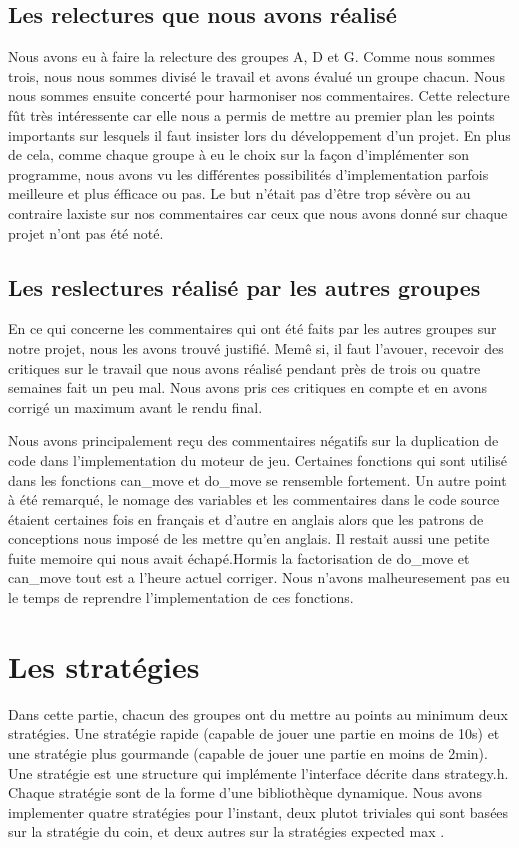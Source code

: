 \documentclass[12pt]{article}
\begin{document}
\subsection{Les relectures que nous avons r\'ealis\'e}
Nous avons eu \`a faire la relecture des groupes A, D et G. Comme nous sommes
trois, nous nous sommes divis\'e le travail et avons \'evalu\'e un groupe
chacun. Nous nous sommes ensuite concert\'e pour harmoniser nos commentaires.
Cette relecture f\^ut tr\`es int\'eressente car elle nous a permis de mettre au
premier plan les points importants sur lesquels il faut insister lors du
d\'eveloppement d'un projet. En plus de cela, comme chaque groupe à eu le choix
sur la façon d'impl\'ementer son programme, nous avons vu les diff\'erentes
possibilit\'es d'implementation parfois meilleure et plus \'efficace ou pas. Le
but n'\'etait pas d'\^etre trop s\'ev\`ere ou au contraire laxiste sur nos
commentaires car ceux que nous avons donn\'e sur chaque projet n'ont pas \'et\'e
not\'e.
\subsection{Les reslectures r\'ealis\'e par les autres groupes}
\label{notre_etude}
En ce qui concerne les commentaires qui ont \'et\'e faits par les autres groupes
sur notre projet, nous les avons trouv\'e justifi\'e. Mem\^e si, il faut
l'avouer, recevoir des \og critiques \fg{} sur le travail que nous avons
r\'ealis\'e pendant pr\`es de trois ou quatre semaines fait un peu mal. Nous avons pris ces critiques en compte et en avons corrig\'e un
maximum avant le rendu final. 
\par Nous avons principalement reçu des commentaires n\'egatifs sur la
duplication de code dans l'implementation du moteur de jeu. Certaines fonctions
qui sont utilis\'e dans les fonctions \og can\_move \fg{} et \og do\_move \fg{} se
rensemble fortement. Un autre point \`a \'et\'e remarqu\'e, le nomage des
variables et les commentaires dans le code source \'etaient certaines fois en
français et d'autre en anglais alors que les patrons de conceptions nous
impos\'e de les mettre qu'en anglais. Il restait aussi une petite fuite memoire
qui nous avait échapé.Hormis la factorisation de do_move et can_move tout est a l'heure actuel corriger. Nous n'avons malheuresement pas eu le temps de reprendre l'implementation de ces fonctions.


\newpage
\section{Les strat\'egies}
Dans cette partie, chacun des groupes ont du mettre au points au minimum deux
strat\'egies. Une strat\'egie rapide (capable de jouer une partie en moins de
10s) et une strat\'egie plus gourmande (capable de jouer une partie en moins de
2min). Une strat\'egie est une structure qui impl\'emente l’interface d\'ecrite
dans strategy.h. Chaque strat\'egie sont de la forme d’une biblioth\`eque
dynamique. Nous avons implementer quatre strat\'egies pour l'instant, deux
plutot triviales qui sont basées sur la strat\'egie du coin, et deux autres sur
la strat\'egies \og expected max \fg{}. 
\end{document}

